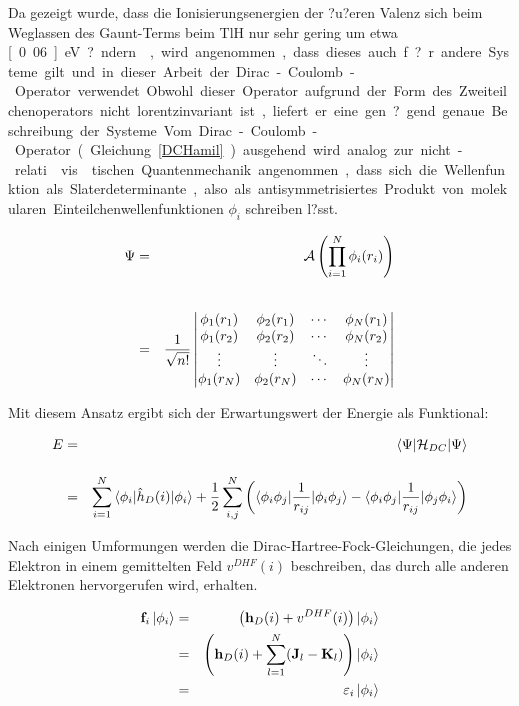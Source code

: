 Da gezeigt wurde, dass die Ionisierungsenergien der ?u?eren Valenz sich beim Weglassen des Gaunt-Terms beim TlH nur sehr gering um etwa \unit[0.06]{eV} ?ndern\cite{Pernpointner05}, wird angenommen, dass dieses auch f?r andere Systeme gilt und in dieser Arbeit der Dirac-Coulomb-Operator verwendet. Obwohl dieser Operator aufgrund der Form des Zweiteilchenoperators nicht lorentzinvariant ist, liefert er eine gen?gend genaue Beschreibung der Systeme.

Vom Dirac-Coulomb-Operator (Gleichung \ref{DCHamil}) ausgehend wird analog zur nicht-relati\-vis\-tischen Quantenmechanik angenommen, dass sich die Wellenfunktion als Slaterdeterminante, also als antisymmetrisiertes Produkt von molekularen Einteilchenwellenfunktionen $\phi_i$ schreiben l?sst.

\begin{eqnarray}
\Psi &=& \mathcal{A} \left(\prod\limits_{i=1}^N\phi_i(r_i)\right)\\\vphantom{\rule{0pt}{50pt}}
     &=& \frac1{\sqrt{n!}}\begin{vmatrix}
\phi_1(r_1) & \phi_2(r_1) & \cdots & \phi_N(r_1)\\
\phi_1(r_2) & \phi_2(r_2) & \cdots & \phi_N(r_2)\\
\vdots      & \vdots     & \ddots  & \vdots\\
\phi_1(r_N) & \phi_2(r_N) & \cdots & \phi_N(r_N)\\
\end{vmatrix}
\end{eqnarray}

Mit diesem Ansatz ergibt sich der Erwartungswert der Energie als Funktional:

\begin{eqnarray}
  E &=& \braket{\Psi|\mathcal{H}_{DC}|\Psi}\\\vphantom{\rule{0pt}{30pt}}
  &=& \sum\limits_{i=1}^N\braket{\phi_i|\hat{h}_D(i)|\phi_i}  + \frac12 \sum\limits_{i,j}^N\left(\braket{\phi_i\phi_j|\frac1{r_{ij}}|\phi_i\phi_j} - \braket{\phi_i\phi_j|\frac1{r_{ij}}|\phi_j\phi_i}\right)
\end{eqnarray}

Nach einigen Umformungen werden die Dirac-Hartree-Fock-Gleichungen, die jedes Elektron in einem gemittelten Feld $v^{DHF}(i)$ beschreiben, das durch alle anderen Elektronen hervorgerufen wird, erhalten.

\begin{eqnarray}
\mathbf{f}_i\ket{\phi_i} &=& \left(\mathbf{h}_D(i) + v^{DHF}(i)\right)\ket{\phi_i}\\
                         &=& \left( \mathbf{h}_D(i) + \sum\limits_{l=1}^{N}(\mathbf{J}_l-\mathbf{K}_l)\right)\ket{\phi_i}\\
                         &=& \varepsilon_i\ket{\phi_i}
\end{eqnarray}

